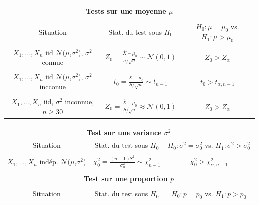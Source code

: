 \documentclass[12pt,french]{article}
\begin{document}
{\small
\begin{center}
\begin{tabular}{|c|c|c|}
\hline \multicolumn{3}{|c|}{{\bf Tests sur une moyenne $\mu$}} \\
\hline && \\
Situation & Stat. du test sous $H_{0}$& $H_{0}:  \mu = \mu_{0}$ vs. $H_{1}:  \mu > \mu_{0}$ \\
\hline \hline & & \\
$ X_1,...,X_n$ iid $\mathcal{N}(\mu$,$\sigma^2$), $\sigma^2$ connue & $\displaystyle Z_{0}=\frac{{\overline X} - \mu_{0}}{\sigma /\sqrt{n}} \sim \mathcal{N}(0,1)$ & $Z_{0}>Z_{\alpha}$ \\
\hline & & \\
$ X_1,...,X_n$ iid $\mathcal{N}(\mu$,$\sigma^2$), $\sigma^2$ incconue & $\displaystyle
t_{0}=\frac{{\overline X} - \mu_{0}}{S / \sqrt{n}}\sim t_{n-1}$ &
$t_{0}>t_{\alpha ,n-1}$
\\

\hline
&  &
\\
$ X_1,...,X_n$ iid, $\sigma^2$ inconnue, $n\geq30$ & $\displaystyle
Z_{0}=\frac{{\overline X} - \mu_{0}}{S / \sqrt{n}}\approx \mathcal{N}(0,1)$ &
$Z_{0}>Z_{\alpha}$
\\

\hline
\end{tabular}
\end{center}


\begin{center}
\begin{tabular}{|c|c|c|}
\hline \multicolumn{3}{|c|}{{\bf Test sur une variance
$\sigma^2$}}
\\
\hline Situation & Stat. du test sous $H_0$ & $H_{0}:  \sigma^2 =
\sigma^2_0$ vs. $H_{1}: \sigma^2 > \sigma^2_0 $
\\

\hline
\hline
 &  &
 \\
$ X_1,...,X_n$ indép. $\mathcal{N}(\mu$,$\sigma^2$) & $\displaystyle
\chi^2_0=\frac{(n-1)S^2}{\sigma^2_0}\sim\chi^2_{n-1}$ &
$\chi^2_{0}>\chi^2_{\alpha,n-1}$
\\

\hline 
\multicolumn{3}{c}{ }
\\
\hline \multicolumn{3}{|c|}{{\bf Test sur une proportion $p$}}
\\
\hline &&\\Situation & Stat. du test sous $H_0$ & $H_{0}:p = p_{0}$ vs. $H_{1}:p > p_{0}$
\\



\end{tabular}
\end{center}}
\end{document}
